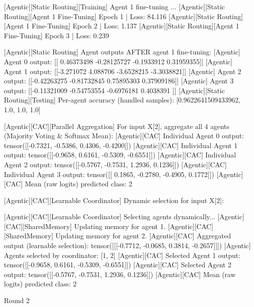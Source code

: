 [Agentic][Static Routing][Training] Agent 1 fine-tuning ...
[Agentic][Static Routing][Agent 1 Fine-Tuning] Epoch 1 | Loss: 84.116
[Agentic][Static Routing][Agent 1 Fine-Tuning] Epoch 2 | Loss: 1.137
[Agentic][Static Routing][Agent 1 Fine-Tuning] Epoch 3 | Loss: 0.239

[Agentic][Static Routing] Agent outputs AFTER agent 1 fine-tuning:
[Agentic] Agent 0 output: [[ 0.46373498 -0.28125727 -0.1933912   0.31959355]]
[Agentic] Agent 1 output: [[-3.271072   4.088706  -3.6528215 -3.3038821]]
[Agentic] Agent 2 output: [[-0.42263275 -0.81732845  0.75895303  0.37909186]]
[Agentic] Agent 3 output: [[-0.11321009 -0.54753554 -0.6976181   0.4038391 ]]
[Agentic][Static Routing][Testing] Per-agent accuracy (handled samples): [0.9622641509433962, 1.0, 1.0, 1.0]

[Agentic][CAC][Parallel Aggregation] For input X[2], aggregate all 4 agents (Majority Voting & Softmax Mean):
[Agentic][CAC] Individual Agent 0 output: tensor([[-0.7321, -0.5386,  0.4306, -0.4200]])
[Agentic][CAC] Individual Agent 1 output: tensor([[-0.9658,  0.6161, -0.5309, -0.6551]])
[Agentic][CAC] Individual Agent 2 output: tensor([[-0.5767, -0.7531,  1.2936,  0.1236]])
[Agentic][CAC] Individual Agent 3 output: tensor([[ 0.1865, -0.2780, -0.4905,  0.1772]])
[Agentic][CAC] Mean (raw logits) predicted class: 2

[Agentic][CAC][Learnable Coordinator] Dynamic selection for input X[2]:

[Agentic][CAC][Learnable Coordinator] Selecting agents dynamically...
[Agentic][CAC][SharedMemory] Updating memory for agent 1.
[Agentic][CAC][SharedMemory] Updating memory for agent 2.
[Agentic][CAC] Aggregated output (learnable selection): tensor([[[-0.7712, -0.0685,  0.3814, -0.2657]]])
[Agentic] Agents selected by coordinator: [1, 2]
[Agentic][CAC] Selected Agent 1 output: tensor([[-0.9658,  0.6161, -0.5309, -0.6551]])
[Agentic][CAC] Selected Agent 2 output: tensor([[-0.5767, -0.7531,  1.2936,  0.1236]])
[Agentic][CAC] Mean (raw logits) predicted class: 2

Round 2

